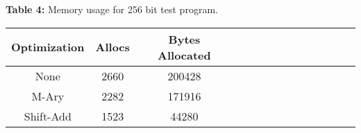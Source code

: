\documentclass[twocolumn]{IEEEtran}
\begin{document}
\begin{center}
\textbf{Table 4:} Memory usage for 256 bit test program. \\[1em]
\begin{tabular}{|c|c|c|c|c|c|c|c|c|c|c|c|c|c|} \hline
Optimization & Allocs & Bytes Allocated \\ \hline
None 		&  2660	& 200428\\ \hline
M-Ary 		&  2282	& 171916\\ \hline
Shift-Add 	&  1523	& 44280\\ \hline
\end{tabular}	
\end{center}
\end{document}
